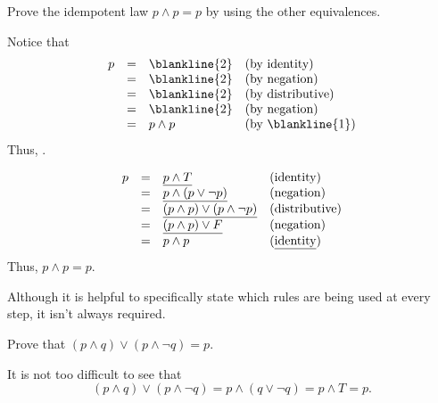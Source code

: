 \begin{fib}
Prove the idempotent law  $p\wedge p  = p$ by using the
other equivalences.   
\begin{pf}
Notice that
$$
\begin{array}{llll}
p &=&\blankline{2} &\mbox{(by identity)}\\
&=&\blankline{2} &\mbox{(by negation)}\\
&=&\blankline{2} &\mbox{(by distributive)}\\
&=&\blankline{2}&\mbox{(by negation)}\\
&=& p\wedge p &\mbox{(by \blankline{1})}\\
\end{array} $$  
Thus, .
\end{pf}
\begin{answer}
$$
\begin{array}{llll}
p &=&\underline{p \wedge T} &\mbox{(identity)}\\
&=&\underline{ p \wedge (p\vee \neg p)} &\mbox{(negation)}\\
&=&\underline{(p \wedge p)\vee(p \wedge\neg p)} &\mbox{(distributive)}\\
&=&\underline{(p\wedge p)\vee F}&\mbox{(negation)}\\
&=& p\wedge p &\mbox{(\underline{identity})}\\
\end{array} $$ 
Thus, \underline{$p\wedge p  = p$}.
\end{answer}
\end{fib}

Although it is helpful to specifically state which rules are being used at every step,
it isn't always required.

\begin{exa}\label{thm:thing}
Prove that $(p\wedge q) \vee (p\wedge \neg q) = p$.
\begin{pf} It is not too difficult to see that
 $$(p\wedge q) \vee (p\wedge \neg q) = p\wedge (q \vee \neg q) = p\wedge T = p.$$
\end{pf}
\end{exa}

